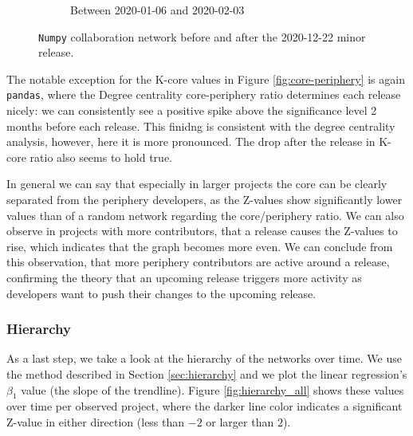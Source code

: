 \begin{figure}
\begin{subfigure}{0.49\textwidth}
        \caption{Between 2020-01-06 and 2020-02-03}
        \label{fig:numpy-after}
    \end{subfigure}
    \caption{\texttt{Numpy} collaboration network before and after the 2020-12-22 minor release.}
    \label{fig:core-periphery-numpy}
\end{figure}

The notable exception for the K-core values in Figure \ref{fig:core-periphery} is again \texttt{pandas}, where the Degree centrality core-periphery ratio determines each release nicely: we can consistently see a positive spike above the significance level 2 months before each release. This finidng is consistent with the degree centrality analysis, however, here it is more pronounced. The drop after the release in K-core ratio also seems to hold true.

In general we can say that especially in larger projects the core can be clearly separated from the periphery developers, as the Z-values show significantly lower values than of a random network regarding the core/periphery ratio. We can also observe in projects with more contributors, that a release causes the Z-values to rise, which indicates that the graph becomes more even. We can conclude from this observation, that more periphery contributors are active around a release, confirming the theory that an upcoming release triggers more activity as developers want to push their changes to the upcoming release.

\subsubsection{Hierarchy}

As a last step, we take a look at the hierarchy of the networks over time. We use the method described in Section \ref{sec:hierarchy} and we plot the linear regression's $\beta_1$ value (the slope of the trendline). Figure \ref{fig:hierarchy_all} shows these values over time per observed project, where the darker line color indicates a significant Z-value in either direction (less than $-2$ or larger than $2$).

